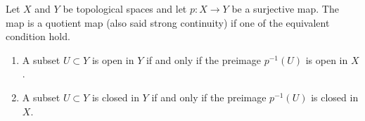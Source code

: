 \begin{defbox}
    Let \(X\) and \(Y\) be topological spaces and let \(p: X \longrightarrow Y\) be a surjective map. The map is a quotient map (also said strong continuity) if one of the equivalent condition hold.
    \begin{enumerate}
        \item A subset \(U \subset Y\) is open in \(Y\) if and only if the preimage \(p^{-1}(U)\) is open in \(X\).
        \item A subset \(U \subset Y\) is closed in \(Y\) if and only if the preimage \(p^{-1}(U)\) is closed in \(X\).
    \end{enumerate}
\end{defbox}
\newpage
